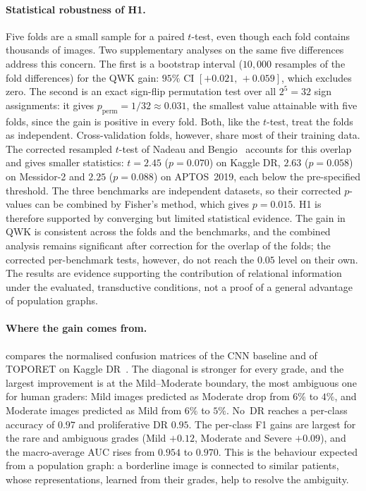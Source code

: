 \paragraph{Statistical robustness of H1.}
Five folds are a small sample for a paired $t$-test, even though each fold contains
thousands of images. Two supplementary analyses on the same five differences address this concern. The
first is a bootstrap interval ($10{,}000$ resamples of the fold differences) for the QWK
gain: $95\%$ CI $[+0.021,\,+0.059]$, which excludes zero. The second is an exact sign-flip
permutation test over all $2^5=32$ sign assignments: it gives $p_{\mathrm{perm}}=1/32\approx
0.031$, the smallest value attainable with five folds, since the gain is positive in every
fold. Both,
like the $t$-test, treat the folds as independent. Cross-validation folds, however, share most of their training data. The corrected
resampled $t$-test of Nadeau and Bengio~\cite{nadeau2003inference} accounts for this
overlap and gives smaller statistics: $t=2.45$ ($p=0.070$) on Kaggle DR, $2.63$
($p=0.058$) on Messidor-2 and $2.25$ ($p=0.088$) on APTOS~2019, each below the
pre-specified threshold. The three benchmarks are
independent datasets, so their corrected $p$-values can be combined by Fisher's method,
which gives $p=0.015$. H1 is therefore supported by converging but limited statistical evidence. The gain in
QWK is consistent across the folds and the benchmarks, and the combined analysis remains
significant after correction for the overlap of the folds; the corrected per-benchmark
tests, however, do not reach the $0.05$ level on their own. The results are evidence
supporting the contribution of relational information under the evaluated, transductive
conditions, not a proof of a general advantage of population graphs.

\paragraph{Where the gain comes from.}
 compares the normalised confusion matrices of the CNN baseline and of
TOPORET on Kaggle DR~\cite{belhadj2025plos}. The diagonal is stronger for every grade, and
the largest improvement is at the Mild--Moderate boundary, the most ambiguous one for human
graders: Mild images predicted as Moderate drop from $6\%$ to $4\%$, and Moderate images
predicted as Mild from $6\%$ to $5\%$. No~DR reaches a per-class accuracy of $0.97$ and
proliferative DR $0.95$. The per-class F1 gains are largest for the rare and ambiguous
grades (Mild $+0.12$, Moderate and Severe $+0.09$), and the macro-average AUC rises from
$0.954$ to $0.970$. This is the behaviour expected from a population graph: a borderline
image is connected to similar patients, whose representations, learned from their grades, help to resolve the ambiguity.

